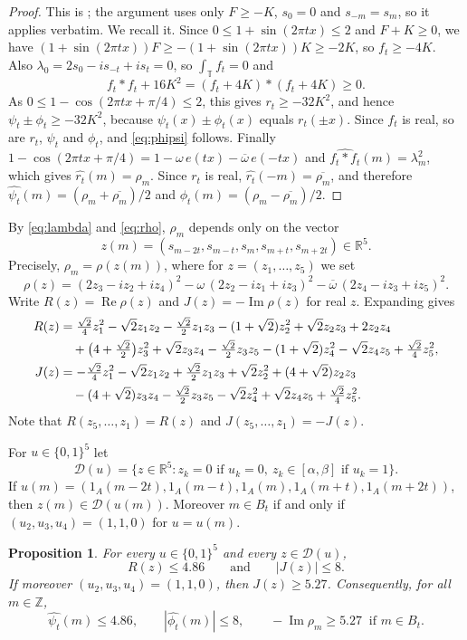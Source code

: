\documentclass{amsart}
\newtheorem{proposition}[theorem]{Proposition}
\theoremstyle{remark}
\numberwithin{equation}{section}
\numberwithin{table}{section}
\newcommand{\T}{\mathbb{T}}
\newcommand{\Z}{\mathbb{Z}}
\newcommand{\R}{\mathbb{R}}
\newcommand{\D}{\mathcal{D}}
\DeclareMathOperator{\re}{Re}
\DeclareMathOperator{\im}{Im}
\begin{document}
\begin{proof}
This is \cite[(36)--(40)]{Bed}; the argument uses only $F\ge-K$, $s_0=0$ and $s_{-m}=s_m$, so it applies verbatim. We recall it. Since $0\le1+\sin(2\pi tx)\le2$ and $F+K\ge0$, we have $(1+\sin(2\pi tx))F\ge-(1+\sin(2\pi tx))K\ge-2K$, so $f_t\ge-4K$. Also $\lambda_0=2s_0-i s_{-t}+i s_t=0$, so $\int_\T f_t=0$ and
\[
f_t*f_t+16K^2=(f_t+4K)*(f_t+4K)\ge0.
\]
As $0\le1-\cos(2\pi tx+\pi/4)\le2$, this gives $r_t\ge-32K^2$, and hence $\psi_t\pm\phi_t\ge-32K^2$, because $\psi_t(x)\pm\phi_t(x)$ equals $r_t(\pm x)$. Since $f_t$ is real, so are $r_t$, $\psi_t$ and $\phi_t$, and \eqref{eq:phipsi} follows. Finally $1-\cos(2\pi tx+\pi/4)=1-\omega\,e(tx)-\overline\omega\,e(-tx)$ and $\widehat{f_t*f_t}(m)=\lambda_m^2$, which gives $\widehat{r_t}(m)=\rho_m$. Since $r_t$ is real, $\widehat{r_t}(-m)=\overline{\rho_m}$, and therefore $\widehat{\psi_t}(m)=(\rho_m+\overline{\rho_m})/2$ and $\widehat{\phi_t}(m)=(\rho_m-\overline{\rho_m})/2$.
\end{proof}

By \eqref{eq:lambda} and \eqref{eq:rho}, $\rho_m$ depends only on the vector
\[
z(m)=(s_{m-2t},s_{m-t},s_m,s_{m+t},s_{m+2t})\in\R^5.
\]
Precisely, $\rho_m=\rho(z(m))$, where for $z=(z_1,\dots,z_5)$ we set
\[
\rho(z)=(2z_3-iz_2+iz_4)^2-\omega\,(2z_2-iz_1+iz_3)^2-\overline\omega\,(2z_4-iz_3+iz_5)^2.
\]
Write $R(z)=\re\rho(z)$ and $J(z)=-\im\rho(z)$ for real $z$. Expanding gives
\begin{align}
R(z)&=\tfrac{\sqrt2}4z_1^2-\sqrt2z_1z_2-\tfrac{\sqrt2}2z_1z_3-(1+\sqrt2)z_2^2+\sqrt2z_2z_3+2z_2z_4\notag\\
&\quad+\bigl(4+\tfrac{\sqrt2}2\bigr)z_3^2+\sqrt2z_3z_4-\tfrac{\sqrt2}2z_3z_5-(1+\sqrt2)z_4^2-\sqrt2z_4z_5+\tfrac{\sqrt2}4z_5^2,\label{eq:R}\\
J(z)&=-\tfrac{\sqrt2}4z_1^2-\sqrt2z_1z_2+\tfrac{\sqrt2}2z_1z_3+\sqrt2z_2^2+(4+\sqrt2)z_2z_3\notag\\
&\quad-(4+\sqrt2)z_3z_4-\tfrac{\sqrt2}2z_3z_5-\sqrt2z_4^2+\sqrt2z_4z_5+\tfrac{\sqrt2}4z_5^2.\label{eq:J}
\end{align}
Note that $R(z_5,\dots,z_1)=R(z)$ and $J(z_5,\dots,z_1)=-J(z)$.

For $u\in\{0,1\}^5$ let
\[
\D(u)=\{z\in\R^5:z_k=0\text{ if }u_k=0,\ z_k\in[\alpha,\beta]\text{ if }u_k=1\}.
\]
If $u(m)=(1_A(m-2t),1_A(m-t),1_A(m),1_A(m+t),1_A(m+2t))$, then $z(m)\in\D(u(m))$. Moreover $m\in B_t$ if and only if $(u_2,u_3,u_4)=(1,1,0)$ for $u=u(m)$.

\begin{proposition}\label{prop:local}
For every $u\in\{0,1\}^5$ and every $z\in\D(u)$,
\[
R(z)\le4.86\qquad\text{and}\qquad|J(z)|\le8.
\]
If moreover $(u_2,u_3,u_4)=(1,1,0)$, then $J(z)\ge5.27$. Consequently, for all $m\in\Z$,
\begin{equation}\label{eq:local}
\widehat{\psi_t}(m)\le4.86,\qquad|\widehat{\phi_t}(m)|\le8,\qquad-\im\rho_m\ge5.27\ \text{ if } m\in B_t.
\end{equation}
\end{proposition}
\end{document}
